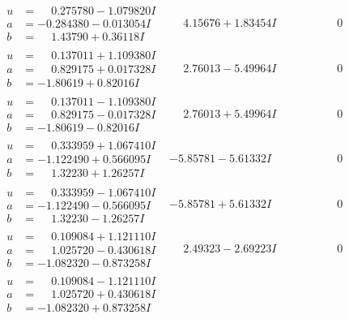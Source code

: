 \documentclass[1p]{elsarticle_modified}
\theoremstyle{definition}
\begin{document}
$$\begin{array}{c|c|c}
\begin{aligned}
u &= \phantom{-}0.275780 - 1.079820 I \\
a &= -0.284380 - 0.013054 I \\
b &= \phantom{-}1.43790 + 0.36118 I\end{aligned}
 & \phantom{-}4.15676 + 1.83454 I & \phantom{-0.000000 } 0 \\ \hline\begin{aligned}
u &= \phantom{-}0.137011 + 1.109380 I \\
a &= \phantom{-}0.829175 + 0.017328 I \\
b &= -1.80619 + 0.82016 I\end{aligned}
 & \phantom{-}2.76013 - 5.49964 I & \phantom{-0.000000 } 0 \\ \hline\begin{aligned}
u &= \phantom{-}0.137011 - 1.109380 I \\
a &= \phantom{-}0.829175 - 0.017328 I \\
b &= -1.80619 - 0.82016 I\end{aligned}
 & \phantom{-}2.76013 + 5.49964 I & \phantom{-0.000000 } 0 \\ \hline\begin{aligned}
u &= \phantom{-}0.333959 + 1.067410 I \\
a &= -1.122490 + 0.566095 I \\
b &= \phantom{-}1.32230 + 1.26257 I\end{aligned}
 & -5.85781 - 5.61332 I & \phantom{-0.000000 } 0 \\ \hline\begin{aligned}
u &= \phantom{-}0.333959 - 1.067410 I \\
a &= -1.122490 - 0.566095 I \\
b &= \phantom{-}1.32230 - 1.26257 I\end{aligned}
 & -5.85781 + 5.61332 I & \phantom{-0.000000 } 0 \\ \hline\begin{aligned}
u &= \phantom{-}0.109084 + 1.121110 I \\
a &= \phantom{-}1.025720 - 0.430618 I \\
b &= -1.082320 - 0.873258 I\end{aligned}
 & \phantom{-}2.49323 - 2.69223 I & \phantom{-0.000000 } 0 \\ \hline\begin{aligned}
u &= \phantom{-}0.109084 - 1.121110 I \\
a &= \phantom{-}1.025720 + 0.430618 I \\
b &= -1.082320 + 0.873258 I\end{aligned}

\end{array}$$
\end{document}
